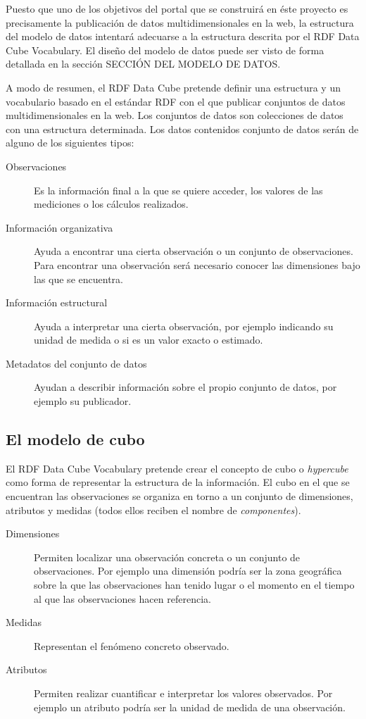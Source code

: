 Puesto que uno de los objetivos del portal que se construirá en éste proyecto es precisamente la publicación de datos multidimensionales en la web, la estructura del modelo de datos intentará adecuarse a la estructura descrita por el RDF Data Cube Vocabulary.  El diseño del modelo de datos puede ser visto de forma detallada en la sección SECCIÓN DEL MODELO DE DATOS.

A modo de resumen, el RDF Data Cube pretende definir una estructura y un vocabulario basado en el estándar RDF con el que publicar conjuntos de datos multidimensionales en la web.  Los conjuntos de datos son colecciones de datos con una estructura determinada.  Los datos contenidos conjunto de datos serán de alguno de los siguientes tipos:
\begin{description}
\item[Observaciones]  Es la información final a la que se quiere acceder, los valores de las mediciones o los cálculos realizados.
\item[Información organizativa]  Ayuda a encontrar una cierta observación o un conjunto de observaciones.  Para encontrar una observación será necesario conocer las dimensiones bajo las que se encuentra.
\item[Información estructural]   Ayuda a interpretar una cierta observación, por ejemplo indicando su unidad de medida o si es un valor exacto o estimado.
\item[Metadatos del conjunto de datos]  Ayudan a describir información sobre el propio conjunto de datos, por ejemplo su publicador.
\end{description}

\subsection{El modelo de cubo}
El RDF Data Cube Vocabulary pretende crear el concepto de cubo o \textit{hypercube} como forma de representar la estructura de la información. El cubo en el que se encuentran las observaciones se organiza en torno a un conjunto de dimensiones, atributos y medidas (todos ellos reciben el nombre de \textit{componentes}).
\begin{description}
\item[Dimensiones]  Permiten localizar una observación concreta o un conjunto de observaciones.  Por ejemplo una dimensión podría ser la zona geográfica sobre la que las observaciones han tenido lugar o el momento en el tiempo al que las observaciones hacen referencia.
\item[Medidas]  Representan el fenómeno concreto observado.
\item[Atributos]  Permiten realizar cuantificar e interpretar los valores observados.  Por ejemplo un atributo podría ser la unidad de medida de una observación.
\end{description}

